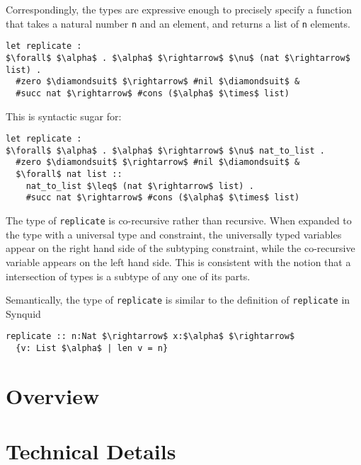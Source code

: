 \documentclass[sigplan,screen]{acmart}
\begin{document}
\hfill

\noindent Correspondingly, the types are expressive enough to precisely specify
a function that takes a natural number \lstinline{n} 
and an element, and returns a list of \lstinline{n} elements.

\begin{lstlisting}[]
let replicate : 
$\forall$ $\alpha$ . $\alpha$ $\rightarrow$ $\nu$ (nat $\rightarrow$ list) .
  #zero $\diamondsuit$ $\rightarrow$ #nil $\diamondsuit$ & 
  #succ nat $\rightarrow$ #cons ($\alpha$ $\times$ list)
\end{lstlisting}

\hfill

\noindent This is syntactic sugar for:

\begin{lstlisting}[]
let replicate : 
$\forall$ $\alpha$ . $\alpha$ $\rightarrow$ $\nu$ nat_to_list .
  #zero $\diamondsuit$ $\rightarrow$ #nil $\diamondsuit$ & 
  $\forall$ nat list :: 
    nat_to_list $\leq$ (nat $\rightarrow$ list) .
    #succ nat $\rightarrow$ #cons ($\alpha$ $\times$ list)
\end{lstlisting}

\hfill

\noindent The type of \lstinline{replicate} is co-recursive rather than recursive. 
When expanded to the type with a universal type and constraint, 
the universally typed variables appear on the right hand side 
of the subtyping constraint, while the co-recursive variable
appears on the left hand side. This is consistent with the notion
that a intersection of types is a subtype of any one of its parts.

\hfill

\noindent Semantically, the type of \lstinline{replicate} is similar to the definition of 
\lstinline{replicate} in Synquid \cite{}    

\begin{lstlisting}[keywords={termination, measure, data, where}]
replicate :: n:Nat $\rightarrow$ x:$\alpha$ $\rightarrow$ 
  {v: List $\alpha$ | len v = n}

\end{lstlisting}


\section{Overview}

\section{Technical Details}
\end{document}
